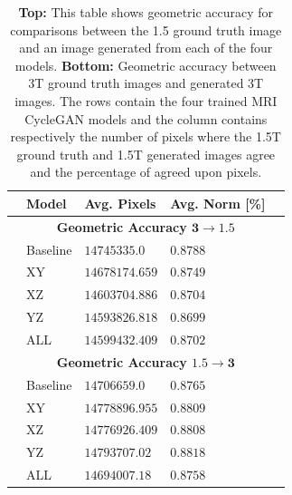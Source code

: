 \documentclass[12pt, fleqn, titlepage]{article}
\newcommand{\1}[1]{\mathds{1}\left[#1\right]}
\begin{document}
\begin{table}[H]
	\begin{center}
		\begin{tabular}{l l l l l}
			\toprule
			& \textbf{Model}   & \textbf{Avg. Pixels} & \textbf{Avg. Norm [\%]}  & \\ \midrule
			&\multicolumn{3}{c}{\textbf{Geometric Accuracy $\mathbf{3\rightarrow1.5}$}}   & \\
			&Baseline          & $14745335.0$         & $0.8788$                 & \\
			&XY                & $14678174.659$       & $0.8749$                 & \\
			&XZ                & $14603704.886$       & $0.8704$                 & \\
			&YZ                & $14593826.818$       & $0.8699$                 & \\
			&ALL               & $14599432.409$       & $0.8702$                 & \\
			&\multicolumn{3}{c}{\textbf{Geometric Accuracy $\mathbf{1.5\rightarrow3}$}}   & \\
			&Baseline          & $14706659.0$         & $0.8765$                 & \\
			&XY                & $14778896.955$	      & $0.8809$                 & \\
			&XZ                & $14776926.409$       & $0.8808$                 & \\
			&YZ                & $14793707.02$        & $0.8818$                 & \\
			&ALL               & $14694007.18$        & $0.8758$                 & \\ \bottomrule
		\end{tabular}
		\caption{\textbf{Top:} This table shows geometric accuracy for comparisons between the 1.5 ground truth image and an image generated from each of the four models. \textbf{Bottom:} Geometric accuracy between 3T ground truth images and generated 3T images. The rows contain the four trained MRI CycleGAN models and the column contains respectively the number of pixels where the 1.5T ground truth and 1.5T generated images agree and the percentage of agreed upon pixels.} %
		\label{tab:metrics_geometric_accuracy}
	\end{center}
\end{table}

\vspace*{-1cm} %
\end{document}
